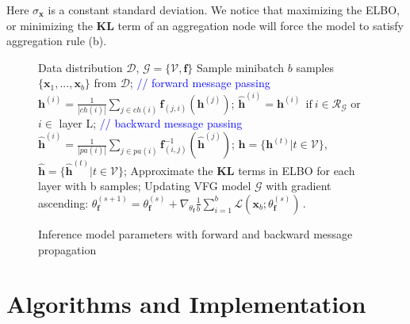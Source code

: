 \documentclass{article}
\begin{document}
 Here $\sigma_{\mathbf{x}}$ is a constant standard deviation. 
We notice that maximizing the ELBO, or minimizing the $\mathbf{KL}$ term of an aggregation node will force the model to satisfy aggregation rule (b). 
  \begin{figure}
 \vspace{-0.1in}
\begin{minipage}{0.5\textwidth}
\begin{algorithm}[H]
   \caption{Inference model parameters with  forward and backward message propagation}
   \label{alg:main}
\begin{algorithmic}[1]
    Data distribution $\mathcal{D}$,  $\mathcal{G} = \{\mathcal{V}, \mathbf{f}\}$
   \STATE  Sample minibatch $b$ samples $\{\mathbf{x}_1, ..., \mathbf{x}_b \}$ from $\mathcal{D}$;
   \label{line:for2}
    \STATE  \textcolor{blue}{// forward message passing}
   \STATE $\mathbf{h}^{(i)} = \frac{1}{|ch(i)|} \sum_{j \in ch(i) } \mathbf{f}_{(j,i)}(\mathbf{h}^{(j)})$; \label{line:forward} 
    \ENDFOR
    \STATE $\widehat{\mathbf{h}}^{(i)} = \mathbf{h}^{(i)} \ \  \text{if} \ i \in \mathcal{R}_{\mathcal{G}} $ or $i \in$ layer L;
   \STATE \textcolor{blue}{// backward message passing}
   \STATE $\widehat{\mathbf{h}}^{(i)} = \frac{1}{|pa(i)|} \sum_{j \in pa(i) } \mathbf{f}^{-1}_{ (i,j)}(\widehat{\mathbf{h}}^{(j)}) $;\label{line:backward}  
   \ENDFOR
    \STATE  $\mathbf{h} =  \{\mathbf{h}^{(t)} \big |  t \in \mathcal{V} \}$, $\widehat{\mathbf{h}} =  \{\widehat{\mathbf{h}}^{(t)} \big | t \in \mathcal{V} \}$;
    \STATE Approximate the $\mathbf{KL}$ terms in ELBO for each layer with b samples;
    \STATE Updating VFG model $\mathcal{G}$ with gradient ascending: $\theta^{(s+1)}_{\mathbf{f}} = \theta^{(s)}_{\mathbf{f}} + \nabla_{\theta_{\mathbf{f}}}\frac{1}{b} \sum_{i=1}^b  \mathcal{L}(\mathbf{x}_b; \theta^{(s)}_{\mathbf{f}})   \, .$\label{line:update} 
   \ENDFOR
\end{algorithmic}
\end{algorithm}
\end{minipage}
 \vspace{-0.4in}
\end{figure}
 \vspace{-0.2in}
\section{Algorithms and Implementation}\label{sec:algrithm}
\end{document}
